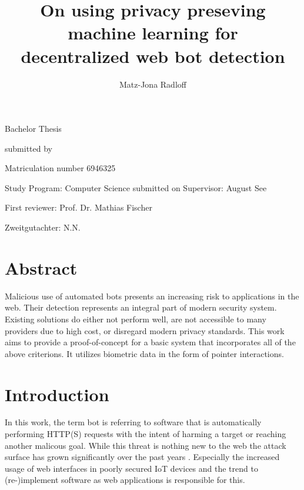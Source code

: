 \documentclass[
    fontsize=12pt,
    headings=small,
    parskip=half,           %
    bibliography=totoc,
    numbers=noenddot,       %
    open=any,               %
    final                   %
]{scrreprt}
\begin{document}
\title{On using privacy preseving machine learning for\\decentralized web bot detection}
\author{Matz-Jona Radloff}


\begin{titlepage}
\begin{center}\Large
	\vfill
    Bachelor Thesis
	\vfill
	\makeatletter
	{\Large\textsf{\textbf{\@title}}\par}
	\makeatother
	\vfill
    submitted by
	\par\bigskip
	\makeatletter
	{\@author} \par
	\makeatother
	Matriculation number 6946325 \par
	Study Program: Computer Science
	\vfill
	\makeatletter
	submitted on {\@date}
	\makeatother
	\vfill
	Supervisor: August See\par
	First reviewer: Prof. Dr. Mathias Fischer \par
	Zweitgutachter: N.N.
\end{center}
\end{titlepage}


\chapter*{Abstract}

Malicious use of automated bots presents an increasing risk to applications in the web. Their detection represents an integral part of modern security system. Existing solutions do either not perform well, are not accessible to many providers due to high cost, or disregard modern privacy standards. This work aims to provide a proof-of-concept for a basic system that incorporates all of the above criterions. It utilizes biometric data in the form of pointer interactions.

\tableofcontents

\chapter{Introduction}

In this work, the term bot is referring to software that is automatically performing HTTP(S) requests with the intent of harming a target or reaching another malicous goal. While this threat is nothing new to the web the attack surface has grown significantly over the past years \cite{BAD_BOT_REPORT2020,BAD_BOT_REPORT2021}. Especially the increased usage of web interfaces in poorly secured IoT devices and the trend to (re-)implement software as web applications is responsible for this.
\end{document}
